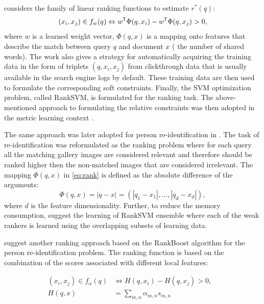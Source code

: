 \citep{joachims2002optimizing} considers the family of linear ranking functions to estimate $r^*(q)$: 
\begin{equation}
\label{eq:rank}
    (x_i, x_j) \in f_w(q) \Leftrightarrow  w^{\mkern-1.5mu\mathsf{T}} \Phi(q, x_i) - w^{\mkern-1.5mu\mathsf{T}} \Phi(q, x_j) > 0,
\end{equation}
where $w$ is a learned weight vector, $\Phi(q, x)$ is a  mapping onto features that describe the match between query $q$ and document $x$ (\eg{} the number of shared words). The work also gives a strategy for automatically acquiring the training data in the form of triplets $(q, x_i, x_j)$ from clickthrough data that is usually available in the search engine logs by default. These training data are then used to formulate the corresponding soft constraints. Finally,  the SVM \citep{cortes1995support} optimization problem, called RankSVM, is formulated for the ranking task. The above-mentioned approach to formulating the relative constraints was then adopted in the metric learning context \citep{Schultz04}.

The same approach was later adopted for person re-identification in \citep{prosser2010person}. The task of re-identification was reformulated as the ranking problem where for each query all the matching gallery images are considered relevant and therefore should be ranked higher then the non-matched images that are considered irrelevant. The mapping $\Phi(q, x)$ in \ref{eq:rank} is defined as the absolute difference of the arguments:
\begin{equation*}
\Phi(q, x) = | q - x | = (| q_1 - x_1|, ..., | q_d - x_d |),     
\end{equation*}
where $d$ is the feature dimensionality. 
Further, to reduce the memory consumption, \citep{prosser2010person} suggest the learning of RankSVM ensemble where each of the weak rankers is learned using the overlapping subsets of learning data.

\citep{kuo2013person} suggest another ranking approach based on the RankBoost algorithm \citep{freund2003efficient} for the person re-identification problem. The ranking function is based on the combination of the scores associated with different local features:


\begin{equation}
  \begin{aligned}
    (x_i, x_j) \in f_{\alpha}(q) & \Leftrightarrow H(q, x_i) - H(q, x_j) > 0, & \\
     H(q, x) & = \sum_{m,n}{\alpha_{m,n}s_{m,n}} & \\
  \end{aligned}
\end{equation}



